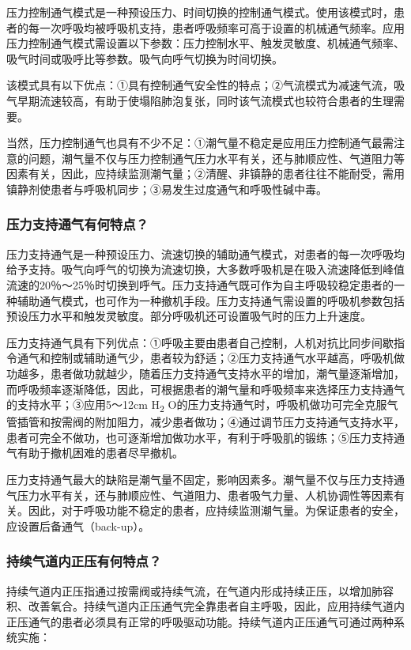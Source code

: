 压力控制通气模式是一种预设压力、时间切换的控制通气模式。使用该模式时，患者的每一次呼吸均被呼吸机支持，患者呼吸频率可高于设置的机械通气频率。应用压力控制通气模式需设置以下参数：压力控制水平、触发灵敏度、机械通气频率、吸气时间或吸呼比等参数。吸气向呼气切换为时间切换。

该模式具有以下优点：①具有控制通气安全性的特点；②气流模式为减速气流，吸气早期流速较高，有助于使塌陷肺泡复张，同时该气流模式也较符合患者的生理需要。

当然，压力控制通气也具有不少不足：①潮气量不稳定是应用压力控制通气最需注意的问题，潮气量不仅与压力控制通气压力水平有关，还与肺顺应性、气道阻力等因素有关，因此，应持续监测潮气量；②清醒、非镇静的患者往往不能耐受，需用镇静剂使患者与呼吸机同步；③易发生过度通气和呼吸性碱中毒。

\subsubsection{压力支持通气有何特点？}

压力支持通气是一种预设压力、流速切换的辅助通气模式，对患者的每一次呼吸均给予支持。吸气向呼气的切换为流速切换，大多数呼吸机是在吸入流速降低到峰值流速的20％～25％时切换到呼气。压力支持通气既可作为自主呼吸较稳定患者的一种辅助通气模式，也可作为一种撤机手段。压力支持通气需设置的呼吸机参数包括预设压力水平和触发灵敏度。部分呼吸机还可设置吸气时的压力上升速度。

压力支持通气具有下列优点：①呼吸主要由患者自己控制，人机对抗比同步间歇指令通气和控制或辅助通气少，患者较为舒适；②压力支持通气水平越高，呼吸机做功越多，患者做功就越少，随着压力支持通气支持水平的增加，潮气量逐渐增加，而呼吸频率逐渐降低，因此，可根据患者的潮气量和呼吸频率来选择压力支持通气的支持水平；③应用5～12cm
H\textsubscript{2}
O的压力支持通气时，呼吸机做功可完全克服气管插管和按需阀的附加阻力，减少患者做功；④通过调节压力支持通气支持水平，患者可完全不做功，也可逐渐增加做功水平，有利于呼吸肌的锻练；⑤压力支持通气有助于撤机困难的患者尽早撤机。

压力支持通气最大的缺陷是潮气量不固定，影响因素多。潮气量不仅与压力支持通气压力水平有关，还与肺顺应性、气道阻力、患者吸气力量、人机协调性等因素有关。因此，对于呼吸功能不稳定的患者，应持续监测潮气量。为保证患者的安全，应设置后备通气（back-up）。

\subsubsection{持续气道内正压有何特点？}

持续气道内正压指通过按需阀或持续气流，在气道内形成持续正压，以增加肺容积、改善氧合。持续气道内正压通气完全靠患者自主呼吸，因此，应用持续气道内正压通气的患者必须具有正常的呼吸驱动功能。持续气道内正压通气可通过两种系统实施：

